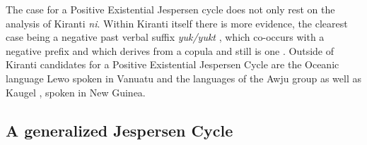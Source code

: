 ﻿\documentclass[output=paper]{langsci/langscibook}
\begin{document}
The case for a Positive Existential Jespersen cycle does not only rest on
the analysis of Kiranti \textit{ni}. Within Kiranti itself there is more
evidence, the clearest case being a negative past verbal suffix
\textit{yuk/yukt} \parencite[163]{Doornenbal2009}, which co-occurs with a
negative prefix and which derives from a copula \parencite[276]{Doornenbal2009}
and still is one \parencite[119]{Doornenbal2009}. Outside of Kiranti candidates
for a Positive Existential Jespersen Cycle are the Oceanic language Lewo
spoken in Vanuatu \parencites[425--426]{Early1994a}[79--80]{Early1994b} and the
languages of the Awju group \parencite[127--140]{Wester2014} as well as Kaugel
\parencite[152--153]{Head1976}, spoken in New Guinea.

\subsection{A generalized Jespersen Cycle}\label{sec:int-4.4}
\end{document}
